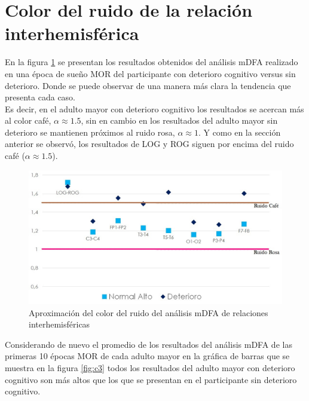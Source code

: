 \documentclass[letterpaper,titlepage,12pt,draft]{report}
\begin{document}
\section{Color del ruido de la relaci\'on interhemisf\'erica}

 En la figura \ref{fig:c2} se presentan los resultados obtenidos del an\'alisis mDFA realizado en una \'epoca de sue\~no MOR del participante con deterioro cognitivo versus sin deterioro. Donde se puede observar de una manera m\'as clara la tendencia que presenta cada caso.\\

Es decir, en el adulto mayor con deterioro cognitivo los resultados se acercan m\'as al color caf\'e, $\alpha\approx 1.5$, sin en cambio en los resultados del adulto mayor sin deterioro se mantienen pr\'oximos al ruido rosa, $\alpha\approx 1$. Y como en la secci\'on anterior se observ\'o, los resultados de LOG y ROG siguen por encima del ruido caf\'e ($\alpha\approx 1.5$).

\begin{figure}[H]
\centering
\includegraphics[scale=0.7]{comp2_1.jpg}
\caption{Aproximaci\'on del color del ruido del an\'alisis mDFA de relaciones interhemisf\'ericas}
\label{fig:c2}
\end{figure}

Considerando de nuevo el promedio de los resultados del an\'alisis mDFA de las primeras 10 \'epocas MOR de cada adulto mayor en la gr\'afica de barras que se muestra en la figura \ref{fig:c3} todos los resultados del adulto mayor con deterioro cognitivo son m\'as altos que los que se presentan en el participante sin deterioro cognitivo.\\
\end{document}
